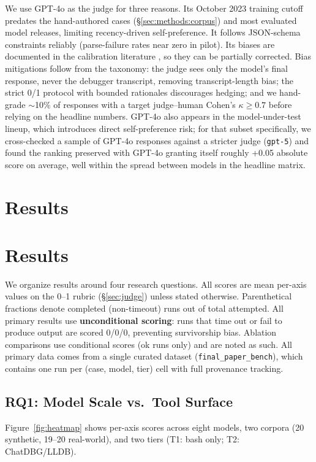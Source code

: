 \documentclass[11pt]{article}
\begin{document}
We use GPT-4o as the judge for three reasons. Its October 2023 training cutoff predates the hand-authored cases (\S\ref{sec:methods:corpus}) and most evaluated model releases, limiting recency-driven self-preference. It follows JSON-schema constraints reliably (parse-failure rates near zero in pilot). Its biases are documented in the calibration literature \citep{zheng2023judging,gu2024llmjudgesurvey}, so they can be partially corrected. Bias mitigations follow from the taxonomy: the judge sees only the model's final response, never the debugger transcript, removing transcript-length bias; the strict 0/1 protocol with bounded rationales discourages hedging; and we hand-grade $\sim$10\% of responses with a target judge--human Cohen's $\kappa \geq 0.7$ before relying on the headline numbers. GPT-4o also appears in the model-under-test lineup, which introduces direct self-preference risk; for that subset specifically, we cross-checked a sample of GPT-4o responses against a stricter judge (\texttt{gpt-5}) and found the ranking preserved with GPT-4o granting itself roughly +0.05 absolute score on average, well within the spread between models in the headline matrix.


\section*{Results}
\section{Results}
\label{sec:results}

We organize results around four research questions. All scores are mean per-axis values on the 0--1 rubric (\S\ref{sec:judge}) unless stated otherwise. Parenthetical fractions denote completed (non-timeout) runs out of total attempted. All primary results use \textbf{unconditional scoring}: runs that time out or fail to produce output are scored 0/0/0, preventing survivorship bias. Ablation comparisons use conditional scores (ok runs only) and are noted as such. All primary data comes from a single curated dataset (\texttt{final\_paper\_bench}), which contains one run per (case, model, tier) cell with full provenance tracking. 

\subsection{RQ1: Model Scale vs.\ Tool Surface}
\label{sec:rq1}

Figure~\ref{fig:heatmap} shows per-axis scores across eight models, two corpora (20 synthetic, 19--20 real-world), and two tiers (T1: bash only; T2: ChatDBG/LLDB).
\end{document}
